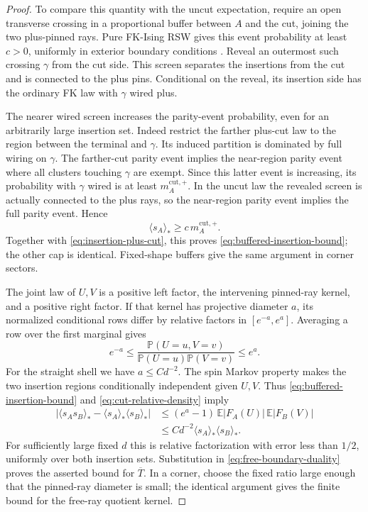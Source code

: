 \begin{proof}
To compare this quantity with the uncut expectation, require an open
transverse crossing in a proportional buffer between $A$ and the cut,
joining the two plus-pinned rays. Pure FK-Ising RSW gives this event
probability at least $c>0$, uniformly in exterior boundary conditions
\cite{CDH}. Reveal an outermost such crossing $\gamma$ from the cut
side. This screen separates the insertions from the cut and is connected
to the plus pins. Conditional on the reveal, its insertion side has
the ordinary FK law with $\gamma$ wired plus.

The nearer wired screen increases the parity-event probability, even
for an arbitrarily large insertion set. Indeed restrict the farther
plus-cut law to the region between the terminal and $\gamma$.
Its induced partition is dominated by full wiring on $\gamma$.
The farther-cut parity event implies the near-region parity event
where all clusters touching $\gamma$ are exempt. Since this latter
event is increasing, its probability with $\gamma$ wired is at least
$m_A^{\mathrm{cut},+}$. In the uncut law the revealed screen is actually
connected to the plus rays, so the near-region parity event implies
the full parity event. Hence
\[
 \langle s_A\rangle_*
     \ge c\,m_A^{\mathrm{cut},+}.
\]
Together with \eqref{eq:insertion-plus-cut}, this proves
\eqref{eq:buffered-insertion-bound}; the other cap is identical.
Fixed-shape buffers give the same argument in corner sectors.

The joint law of $U,V$ is a positive left factor, the intervening
pinned-ray kernel, and a positive right factor. If that kernel has
projective diameter $a$, its normalized conditional rows differ by
relative factors in $[e^{-a},e^a]$. Averaging a row over the first
marginal gives
\begin{equation}
 e^{-a}\le
 \frac{\mathbb P(U=u,V=v)}{\mathbb P(U=u)\mathbb P(V=v)}
 \le e^a.
 \label{eq:cut-relative-density}
\end{equation}
For the straight shell we have $a\le Cd^{-2}$. The spin Markov
property makes the two insertion regions conditionally independent
given $U,V$. Thus \eqref{eq:buffered-insertion-bound} and
\eqref{eq:cut-relative-density} imply
\begin{align*}
 \big|\langle s_A s_B\rangle_*
            -\langle s_A\rangle_*\langle s_B\rangle_*\big|
 &\le (e^a-1)\,\mathbb E|F_A(U)|\,\mathbb E|F_B(V)|\\
 &\le C d^{-2}\langle s_A\rangle_*\langle s_B\rangle_*.
\end{align*}
For sufficiently large fixed $d$ this is relative factorization with
error less than $1/2$, uniformly over both insertion sets. Substitution
in \eqref{eq:free-boundary-duality} proves the asserted bound for
$\overline T$. In a corner, choose the fixed ratio large enough that
the pinned-ray diameter is small; the identical argument gives the
finite bound for the free-ray quotient kernel.


\end{proof}
